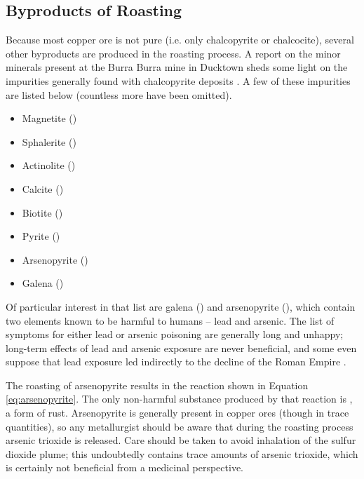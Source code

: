 \subsection{Byproducts of Roasting}

Because most copper ore is not pure (i.e. only chalcopyrite or chalcocite),
several other byproducts are produced in the roasting process.  A report on the
minor minerals present at the Burra Burra mine in Ducktown sheds some light on
the impurities generally found with chalcopyrite deposits \cite{slater1980}.  A
few of these impurities are listed below (countless more have been omitted).

\begin{itemize}
   \item Magnetite ()
   \vspace{-1em}
   \item Sphalerite ()
   \vspace{-1em}
   \item Actinolite ()
   \vspace{-1em}
   \item Calcite ()
   \vspace{-1em}
   \item Biotite ()
   \vspace{-1em}
   \item Pyrite ()
   \vspace{-1em}
   \item Arsenopyrite ()
   \vspace{-1em}
   \item Galena ()
\end{itemize}

Of particular interest in that list are galena () and arsenopyrite
(), which contain two elements known to be harmful to humans -- lead
and arsenic.  The list of symptoms for either lead or arsenic poisoning are
generally long and unhappy; long-term effects of lead and arsenic exposure are
never beneficial, and some even suppose that lead exposure led indirectly to the
decline of the Roman Empire \cite{angier2007}. %

The roasting of arsenopyrite results in the reaction shown in Equation
\ref{eq:arsenopyrite}.  The only non-harmful substance produced by that reaction
is , a form of rust.  Arsenopyrite is generally present in copper ores
(though in trace quantities), so any metallurgist should be aware that during
the roasting process arsenic trioxide is released.  Care should be taken to avoid
inhalation of the sulfur dioxide plume; this undoubtedly contains trace amounts
of arsenic trioxide, which is certainly not beneficial from a medicinal
perspective.

